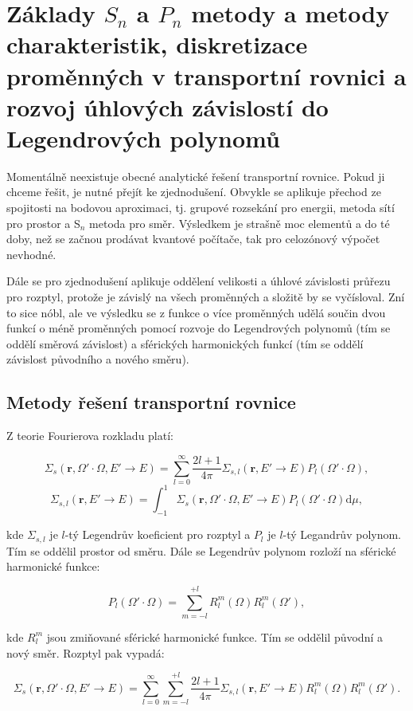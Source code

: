 \section[$S_n$ a $P_n$ metody]{Základy $S_n$ a $P_n$ metody a metody charakteristik, diskretizace proměnných v transportní rovnici a rozvoj úhlových závislostí do Legendrových polynomů}

Momentálně neexistuje obecné analytické řešení transportní rovnice. Pokud ji chceme řešit, je nutné přejít ke zjednodušení. Obvykle se aplikuje přechod ze spojitosti na bodovou aproximaci, tj. grupové rozsekání pro energii, metoda sítí pro prostor a S$_n$ metoda pro směr. Výsledkem je strašně moc elementů a do té doby, než se začnou prodávat kvantové počítače, tak pro celozónový výpočet nevhodné.

Dále se pro zjednodušení aplikuje oddělení velikosti a úhlové závislosti průřezu pro rozptyl, protože je závislý na všech proměnných a složitě by se vyčísloval. Zní to sice nóbl, ale ve výsledku se z funkce o více proměnných udělá součin dvou funkcí o méně proměnných pomocí rozvoje do Legendrových polynomů  (tím se oddělí směrová závislost) a sférických harmonických funkcí (tím se oddělí závislost původního a nového směru). 

\subsection{Metody řešení transportní rovnice}

Z teorie Fourierova rozkladu platí:

$$\Sigma_s(\textbf{r}, \Omega' \cdot \Omega, E' \rightarrow E) = \sum_{l=0}^{\infty} \dfrac{2l + 1}{4 \pi} \Sigma_{s,l}(\textbf{r}, E' \rightarrow E) P_l(\Omega' \cdot \Omega),$$
$$\Sigma_{s,l}(\textbf{r}, E' \rightarrow E) = \int_{-1}^1 \Sigma_s(\textbf{r}, \Omega' \cdot \Omega, E' \rightarrow E) P_l(\Omega' \cdot \Omega) \text{d}\mu,$$

\noindent kde $\Sigma_{s,l}$ je $l$-tý Legendrův koeficient pro rozptyl a $P_l$ je $l$-tý Legandrův polynom. Tím se oddělil prostor od směru. Dále se Legendrův polynom rozloží na sférické harmonické funkce:

$$P_l(\Omega' \cdot \Omega) = \sum_{m=-l}^{+l} R_l^m(\Omega) R_l^m(\Omega'),$$

\noindent kde $R_l^m$ jsou zmiňované sférické harmonické funkce. Tím se oddělil původní a nový směr. Rozptyl pak vypadá:

$$\Sigma_s(\textbf{r}, \Omega' \cdot \Omega, E' \rightarrow E) = \sum_{l=0}^{\infty} \sum_{m=-l}^{+l} \dfrac{2l + 1}{4 \pi} \Sigma_{s,l}(\textbf{r}, E' \rightarrow E) R_l^m(\Omega) R_l^m(\Omega').$$

